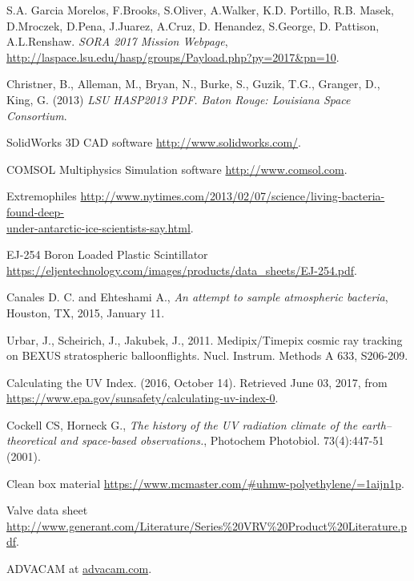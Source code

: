 \newpage

\begin{thebibliography}{9}
S.A. Garcia Morelos, F.Brooks, S.Oliver, A.Walker, K.D. Portillo, R.B. Masek, D.Mroczek, D.Pena, J.Juarez, A.Cruz, D. Henandez, S.George, D. Pattison, A.L.Renshaw. \textit{SORA 2017 Mission Webpage}, \url{http://laspace.lsu.edu/hasp/groups/Payload.php?py=2017&pn=10}.

  Christner, B., Alleman, M., Bryan, N., Burke, S., Guzik, T.G., Granger, D., King, G. (2013) \textit{LSU HASP2013 PDF. Baton Rouge: Louisiana Space Consortium}.

   SolidWorks 3D CAD software \url{http://www.solidworks.com/}.
  
   COMSOL Multiphysics Simulation software \url{http://www.comsol.com}.

  Extremophiles \href{http://www.nytimes.com/2013/02/07/science/living-bacteria-found-deep-under-antarctic-ice-scientists-say.html}{http://www.nytimes.com/2013/02/07/science/living-bacteria-found-deep-\\under-antarctic-ice-scientists-say.html}.

  EJ-254 Boron Loaded Plastic Scintillator \url{https://eljentechnology.com/images/products/data_sheets/EJ-254.pdf}.
  
 Canales D. C. and Ehteshami A., \textit{An attempt to sample atmospheric bacteria}, Houston, TX, 2015, January 11.

Urbar, J., Scheirich, J., Jakubek, J., 2011. Medipix/Timepix cosmic ray tracking on BEXUS stratospheric balloonflights. Nucl. Instrum. Methods A 633, S206-209.
	
  Calculating the UV Index. (2016, October 14). Retrieved June 03, 2017, from \url{https://www.epa.gov/sunsafety/calculating-uv-index-0}.

  Cockell CS, Horneck G., \textit{The history of the UV radiation climate of the earth--theoretical and space-based observations.}, Photochem Photobiol. 73(4):447-51 (2001).

Clean box material \url{https://www.mcmaster.com/\#uhmw-polyethylene/=1aijn1p}.

Valve data sheet \url{http://www.generant.com/Literature/Series\%20VRV\%20Product\%20Literature.pdf}.

  ADVACAM at \url{advacam.com}.


\end{thebibliography}
